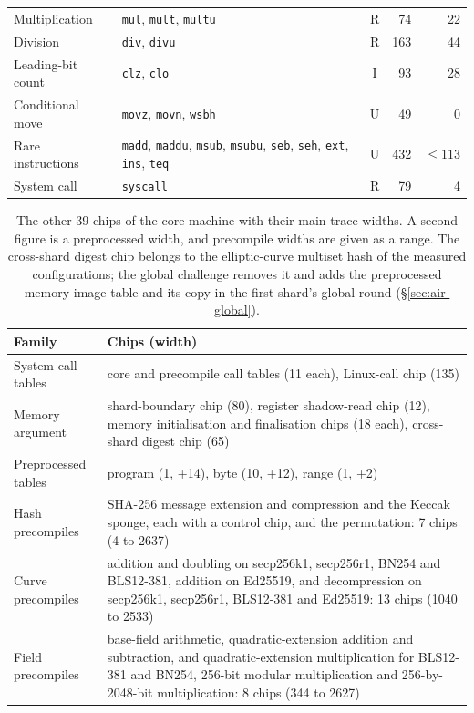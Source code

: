 \begin{table}[!htbp]
\begin{tabular}{@{}l>{\raggedright\arraybackslash}p{}crr@{}}
Multiplication & \texttt{mul}, \texttt{mult}, \texttt{multu} & R & 74 & 22 \\
Division & \texttt{div}, \texttt{divu} & R & 163 & 44 \\
Leading-bit count & \texttt{clz}, \texttt{clo} & I & 93 & 28 \\
Conditional move & \texttt{movz}, \texttt{movn}, \texttt{wsbh} & U & 49 & 0 \\
Rare instructions & \texttt{madd}, \texttt{maddu}, \texttt{msub}, \texttt{msubu}, \texttt{seb}, \texttt{seh}, \texttt{ext}, \texttt{ins}, \texttt{teq} & U & 432 & $\le 113$ \\
System call & \texttt{syscall} & R & 79 & 4 \\
\bottomrule
\end{tabular}
\end{table}

\begin{table}[!htbp]
\centering
\small
\caption{The other 39 chips of the core machine with their main-trace widths. A second figure is a preprocessed width, and precompile widths are given as a range. The cross-shard digest chip belongs to the elliptic-curve multiset hash of the measured configurations; the global challenge removes it and adds the preprocessed memory-image table and its copy in the first shard's global round (\S\ref{sec:air-global}).}
\label{tab:chips-other}
\begin{tabular}{@{}l>{\raggedright\arraybackslash}p{}@{}}
\toprule
Family & Chips (width) \\
\midrule
System-call tables & core and precompile call tables (11 each), Linux-call chip (135) \\
Memory argument & shard-boundary chip (80), register shadow-read chip (12), memory initialisation and finalisation chips (18 each), cross-shard digest chip (65) \\
Preprocessed tables & program (1, +14), byte (10, +12), range (1, +2) \\
Hash precompiles & SHA-256 message extension and compression and the Keccak sponge, each with a control chip, and the \Poseidon{} permutation: 7 chips (4 to 2637) \\
Curve precompiles & addition and doubling on secp256k1, secp256r1, BN254 and BLS12-381, addition on Ed25519, and decompression on secp256k1, secp256r1, BLS12-381 and Ed25519: 13 chips (1040 to 2533) \\
Field precompiles & base-field arithmetic, quadratic-extension addition and subtraction, and quadratic-extension multiplication for BLS12-381 and BN254, 256-bit modular multiplication and 256-by-2048-bit multiplication: 8 chips (344 to 2627) \\
\bottomrule
\end{tabular}
\end{table}
